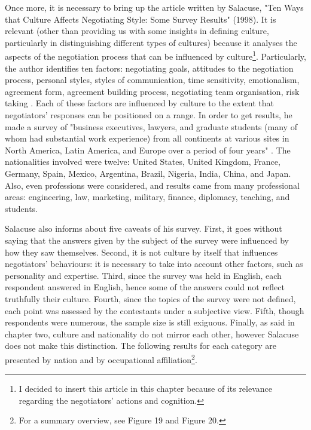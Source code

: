 \documentclass[../main.tex]{subfiles}
\begin{document}
Once more, it is necessary to bring up the article written by Salacuse, "Ten Ways that Culture Affects Negotiating Style: Some Survey Results" (1998). It is relevant (other than providing us with some insights in defining culture, particularly in distinguishing different types of cultures) because it analyses the aspects of the negotiation process that can be influenced by culture\footnote{I decided to insert this article in this chapter because of its relevance regarding the negotiators' actions and cognition.}. Particularly, the author identifies ten factors: negotiating goals, attitudes to the negotiation process, personal styles, styles of communication, time sensitivity, emotionalism, agreement form, agreement building process, negotiating team organisation, risk taking \autocite[223-224]{salacuse}. 
Each of these factors are influenced by culture to the extent that negotiators' responses can be positioned on a range. In order to get results, he made a survey of "business executives, lawyers, and graduate students (many of whom had substantial work experience) from all continents at various sites in North America, Latin America, and Europe over a period of four years" \mancite\autocite[224]{salacuse}.
The nationalities involved were twelve: United States, United Kingdom, France, Germany, Spain, Mexico, Argentina, Brazil, Nigeria, India, China, and Japan. Also, even professions were considered, and results came from many professional areas: engineering, law, marketing, military, finance, diplomacy, teaching, and students.

Salacuse also informs about five caveats of his survey. First, it goes without saying that the answers given by the subject of the survey were influenced by how they saw themselves. Second, it is not culture by itself that influences negotiators' behaviours: it is necessary to take into account other factors, such as personality and expertise. Third, since the survey was held in English, each respondent answered in English, hence some of the answers could not reflect truthfully their culture. Fourth, since the topics of the survey were not defined, each point was assessed by the contestants under a subjective view. Fifth, though respondents were numerous, the sample size is still exiguous. Finally, as said in chapter two, culture and nationality do not mirror each other, however Salacuse does not make this distinction. 
The following results for each category are presented by nation and by occupational affiliation\footnote{For a summary overview, see Figure 19 and Figure 20.}.
\end{document}
